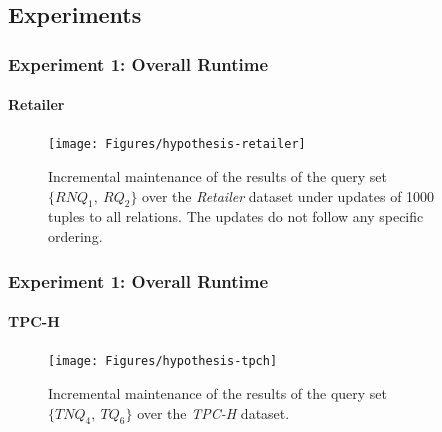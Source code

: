 \documentclass[
	11pt, %
]{beamer}
\begin{document}
\subsection{Experiments}
\begin{frame}
	\frametitle{Experiment 1: Overall Runtime}
	\framesubtitle{Retailer}
	\begin{figure}
		\begin{minipage}{0.25\textwidth}
		\end{minipage}
		\begin{minipage}{0.74\textwidth}
			\texttt{[image: Figures/hypothesis-retailer]} %
		\end{minipage}
		\caption{Incremental maintenance of the results of the query set $\{RNQ_1,\ RQ_2\}$ over the {\em Retailer} dataset under updates of 1000 tuples to all relations. The updates do not follow any specific ordering. }
	\end{figure}
\end{frame}

\begin{frame}
	\frametitle{Experiment 1: Overall Runtime}
	\framesubtitle{TPC-H}
	\begin{figure}		
		\begin{minipage}{0.25\textwidth}
		\end{minipage}
		\begin{minipage}{0.74\textwidth}
			\texttt{[image: Figures/hypothesis-tpch]} %
		\end{minipage}
		\caption{Incremental maintenance of the results of the query set $\{TNQ_4,\ TQ_6\}$ over the {\em TPC-H} dataset.}
	\end{figure}
\end{frame}
\end{document}
